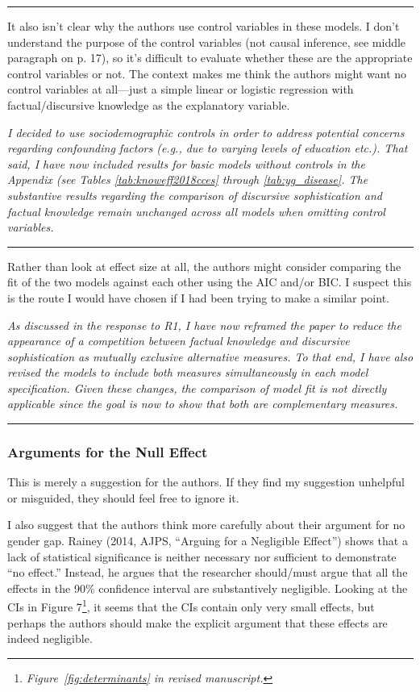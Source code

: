 
\rule{\linewidth}{.01cm}

It also isn’t clear why the authors use control variables in these models. I don’t understand the purpose of the control variables (not causal inference, see middle paragraph on p. 17), so it’s difficult to evaluate whether these are the appropriate control variables or not. The context makes me think the authors might want no control variables at all—just a simple linear or logistic regression with factual/discursive knowledge as the explanatory variable.

\textit{I decided to use sociodemographic controls in order to address potential concerns regarding confounding factors (e.g., due to varying levels of education etc.). That said, I have now included results for basic models without controls in the Appendix (see Tables \ref{tab:knoweff2018cces} through \ref{tab:yg_disease}. The substantive results regarding the comparison of discursive sophistication and factual knowledge remain unchanged across all models when omitting control variables.}


\rule{\linewidth}{.01cm}

Rather than look at effect size at all, the authors might consider comparing the fit of the two models against each other using the AIC and/or BIC. I suspect this is the route I would have chosen if I had been trying to make a similar point.

\textit{As discussed in the response to R1, I have now reframed the paper to reduce the appearance of a competition between factual knowledge and discursive sophistication as mutually exclusive alternative measures. To that end, I have also revised the models to include both measures simultaneously in each model specification. Given these changes, the comparison of model fit is not directly applicable since the goal is now to show that both are complementary measures.}


\rule{\linewidth}{.01cm}

\subsubsection*{Arguments for the Null Effect}

This is merely a suggestion for the authors. If they find my suggestion unhelpful or misguided, they should feel free to ignore it.

I also suggest that the authors think more carefully about their argument for no gender gap. Rainey (2014, AJPS, ``Arguing for a Negligible Effect'') shows that a lack of statistical significance is neither necessary nor sufficient to demonstrate ``no effect.'' Instead, he argues that the researcher should/must argue that all the effects in the 90\% confidence interval are substantively negligible. Looking at the CIs in Figure 7\footnote{\textit{Figure~\ref{fig:determinants} in revised manuscript.}}, it seems that the CIs contain only very small effects, but perhaps the authors should make the explicit argument that these effects are indeed negligible.

